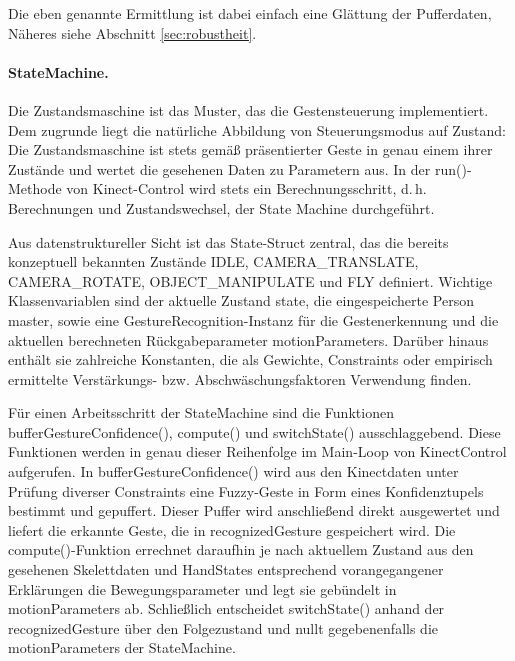 	Die eben genannte \glqq Ermittlung\grqq{} ist dabei einfach eine Glättung der Pufferdaten, Näheres siehe Abschnitt \ref{sec:robustheit}.\par\medskip
	\paragraph{StateMachine.}
	Die Zustandsmaschine ist das Muster, das die Gestensteuerung implementiert. Dem zugrunde liegt die natürliche Abbildung von Steuerungsmodus auf Zustand: Die Zustandsmaschine ist stets gemäß präsentierter Geste in genau einem ihrer Zustände und wertet die gesehenen Daten zu Parametern aus. In der run()-Methode von Kinect-Control wird stets ein Berechnungsschritt, d.\,h. Berechnungen und Zustandswechsel, der State Machine durchgeführt.\par 
	Aus datenstruktureller Sicht ist das State-Struct zentral, das die bereits konzeptuell bekannten Zustände IDLE, CAMERA\_TRANSLATE, CAMERA\_ROTATE, OBJECT\_MANIPULATE und FLY definiert. Wichtige Klassenvariablen sind der aktuelle Zustand \glqq{}state\grqq{}, die eingespeicherte Person \glqq{}master\grqq{}, sowie eine GestureRecognition-Instanz für die Gestenerkennung und die aktuellen berechneten Rückgabeparameter \glqq{}motionParameters\grqq{}. Darüber hinaus enthält sie zahlreiche Konstanten, die als Gewichte, Constraints oder empirisch ermittelte Verstärkungs- bzw. Abschwäschungsfaktoren Verwendung finden.\par 
	Für einen Arbeitsschritt der StateMachine sind die Funktionen bufferGestureConfidence(), compute() und switchState() ausschlaggebend. Diese Funktionen werden in genau dieser Reihenfolge im Main-Loop von KinectControl aufgerufen. In bufferGestureConfidence() wird aus den Kinectdaten unter Prüfung diverser Constraints eine Fuzzy-Geste in Form eines Konfidenztupels bestimmt und gepuffert. Dieser Puffer wird anschließend direkt ausgewertet und liefert die erkannte Geste, die in recognizedGesture gespeichert wird. Die compute()-Funktion errechnet daraufhin je nach aktuellem Zustand aus den gesehenen Skelettdaten und HandStates entsprechend vorangegangener Erklärungen die Bewegungsparameter und legt sie gebündelt in motionParameters ab. Schließlich entscheidet switchState() anhand der recognizedGesture über den Folgezustand und nullt gegebenenfalls die motionParameters der StateMachine.\par 
